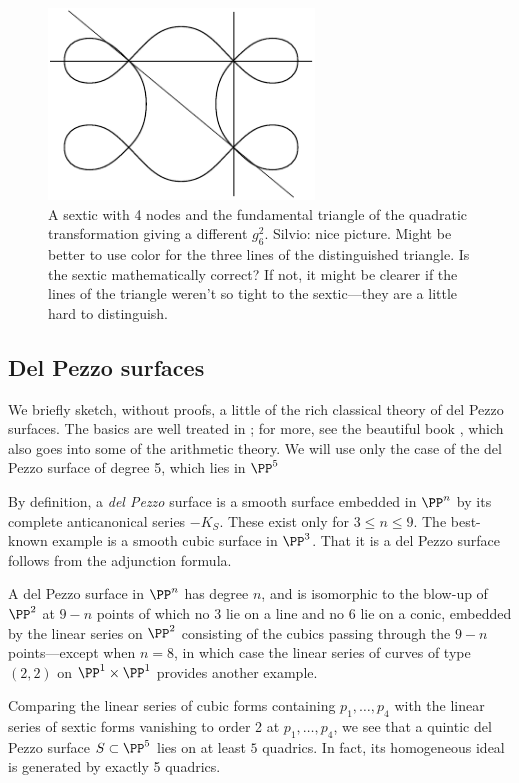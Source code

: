  
\begin{figure}
\centerline {\includegraphics[height=2in]{"main/Fig11-4"}}
\caption{A sextic with 4 nodes and the fundamental triangle of the quadratic transformation giving
a different $g^{2}_{6}$. {Silvio: nice picture. Might be better to use color for the three lines of the distinguished triangle. Is the sextic mathematically correct? If not, it might be clearer if the lines of the triangle weren't so tight to the sextic---they are a little hard to distinguish.}}
\label{default}
\end{figure}


\subsection{Del Pezzo surfaces}

We briefly sketch, without proofs, a little of the 
 rich classical theory of del Pezzo surfaces. The basics are well treated in \cite[pp. 45--50]{Beauville}; for more, see the
beautiful book \cite{Manin}, which also goes into some of the arithmetic theory. We will use only the case of the del Pezzo surface of degree 5, which lies in $\PP^{5}$

By definition,
a \emph{del Pezzo} surface is a smooth surface embedded in $\PP^n$  by its complete anticanonical series $-K_S$. These exist only for $3\leq n\leq 9$. The best-known example is a smooth cubic surface in $\PP^3$. That it is a del Pezzo surface follows from the adjunction formula.

A del Pezzo surface in $\PP^n$ has degree $n$, and is isomorphic to the blow-up of $\PP^2$ at $9-n$ points of which no 3 lie on a line and no 6 lie on a conic, embedded by the linear series on $\PP^2$
consisting of the cubics passing through the $9-n$ points---except when $n=8$, in which case the
linear series of curves of type $(2,2)$ on $\PP^1\times \PP^1$ provides another example.

Comparing the linear series  of cubic forms containing $p_1,\dots,p_4$ with the linear series  of sextic forms vanishing to order 2 at $p_1,\dots,p_4$, we see that a quintic del Pezzo surface $S \subset \PP^5$ lies on at least $5$ quadrics. In fact, its homogeneous ideal is generated by exactly 5 quadrics.

